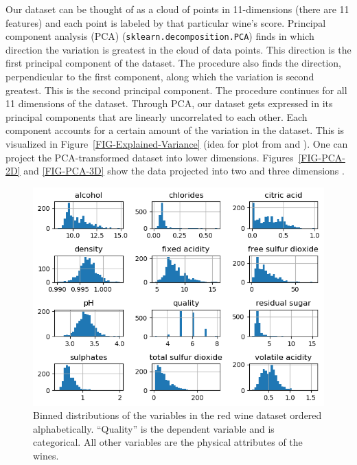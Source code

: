 \documentclass[12pt,preprint]{aastex61}
\begin{document}
Our dataset can be thought of as a cloud of points in 11-dimensions
(there are 11 features) and each point is labeled by that particular
wine's score. Principal component analysis (PCA) (\texttt{sklearn.decomposition.PCA}) finds
in which direction the variation is greatest in the cloud of data
points. This direction is the first principal component of the
dataset. The procedure also finds the direction, perpendicular to the
first component, along which the variation is second greatest. This is
the second principal component. The procedure continues for all 11 dimensions of
the dataset. Through PCA, our dataset gets expressed in its principal components that are linearly uncorrelated
to each other. Each component accounts for a certain amount of the variation in
the dataset. This is visualized in Figure~\ref{FIG-Explained-Variance} (idea for
plot from \citealp{Hong} and \citealp{Raschka_2015}).
One can project the PCA-transformed dataset into lower dimensions.
Figures~\ref{FIG-PCA-2D} and \ref{FIG-PCA-3D} show the data projected into
two and three dimensions \citep{Raschka_2015}.



 \begin{figure}
 \centering 
 \includegraphics[angle=0,width=130mm]{../output/allDataHisto.png}
 \caption{
   Binned distributions of the variables in the red wine dataset ordered alphabetically.
   ``Quality'' is the dependent variable and is categorical. All other variables
   are the physical attributes of the wines.
 \label{FIG-Data-Histo}}
 \end{figure}
\end{document}
